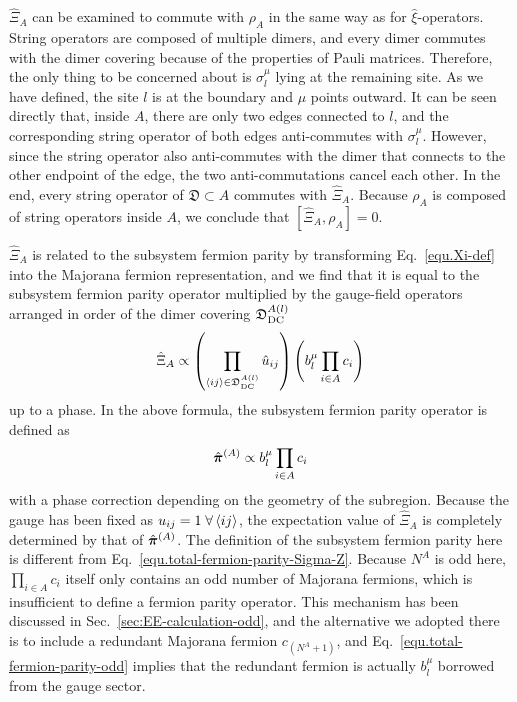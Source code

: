 $\hat{\Xi}_A$ can be examined to commute with $\rho_A$ in the same way as for $\hat{\xi}$-operators. String operators are composed of multiple dimers, and every dimer commutes with the dimer covering because of the properties of Pauli matrices. Therefore, the only thing to be concerned about is $\sigma^\mu_l$ lying at the remaining site.
As we have defined, the site $l$ is at the boundary and $\mu$ points outward. It can be seen directly that, inside $A$, there are only two edges connected to $l$, and the corresponding string operator of both edges anti-commutes with $\sigma^\mu_l$. However, since the string operator also anti-commutes with the dimer that connects to the other endpoint of the edge, the two anti-commutations cancel each other. In the end, every string operator of $\mathfrak{D}\subset A$ commutes with $\hat{\Xi}_A$. Because $\rho_A$ is composed of string operators inside $A$, we conclude that $[\hat{\Xi}_A,\rho_A]=0$. 

$\hat{\Xi}_A$ is related to the subsystem fermion parity by transforming Eq.~\eqref{equ.Xi-def} into the Majorana fermion representation, and we find that it is equal to the subsystem fermion parity operator multiplied by the gauge-field operators arranged in order of the dimer covering $\mathfrak{D}^{A(l)}_{\mathrm{DC}}$
\[
\hat{\Xi}_A \propto \left( \prod_{\left\langle ij \right\rangle\in  \mathfrak{D}^{A(l)}_{\mathrm{DC}}} \hat{u}_{ij} \right) \left( b^\mu_l\prod_{i\in A}c_i \right)
\]
up to a phase. In the above formula, the subsystem fermion parity operator is defined as
\begin{equation}\label{equ.total-fermion-parity-odd}
    \hat{\boldsymbol{\pi}}^{(A)} \propto b^\mu_l\prod_{i\in A}c_i
\end{equation}
with a phase correction depending on the geometry of the subregion. Because the gauge has been fixed as $u_{ij}=1\;\forall\left\langle ij \right\rangle$, the expectation value of $\hat{\Xi}_A$ is completely determined by that of $\hat{\boldsymbol{\pi}}^{(A)}$. The definition of the subsystem fermion parity here is different from Eq.~\eqref{equ.total-fermion-parity-Sigma-Z}. Because $N^A$ is odd here, $\prod_{i\in A}c_i$ itself only contains an odd number of Majorana fermions, which is insufficient to define a fermion parity operator. This mechanism has been discussed in Sec.~\ref{sec:EE-calculation-odd}, and the alternative we adopted there is to include a redundant Majorana fermion $c_{(N^A+1)}$, and Eq.~\eqref{equ.total-fermion-parity-odd} implies that the redundant fermion is actually $b^\mu_l$ borrowed from the gauge sector. 

